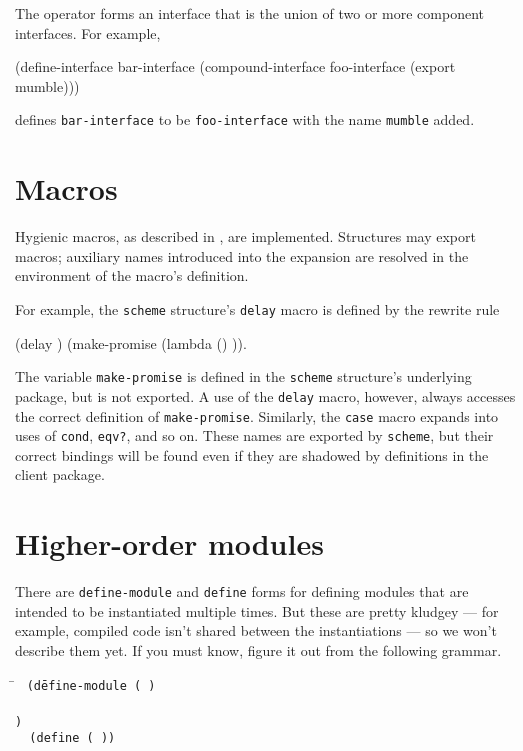 The  operator forms an interface that is the
union of two or more component interfaces.  For example,
\begin{example}
(define-interface bar-interface
  (compound-interface foo-interface (export mumble)))
\end{example}
defines {\tt bar-interface} to be {\tt foo-interface} with the name
{\tt mumble} added.


\section{Macros}

Hygienic macros, as described in
\cite{Clinger-Rees:Macros,Clinger-Rees:R4RS}, are implemented.
Structures may export macros; auxiliary names introduced into the
expansion are resolved in the environment of the macro's definition.

For example, the {\tt scheme} structure's {\tt delay} macro 
is defined by the rewrite rule
\begin{example}
(delay )  \xform  (make-promise (lambda () )).
\end{example}
The variable {\tt make-promise} is defined in the {\tt scheme}
structure's underlying package, but is not exported.  A use of the
{\tt delay} macro, however, always accesses the correct definition
of {\tt make-promise}.  Similarly, the {\tt case} macro expands into
uses of {\tt cond}, {\tt eqv?}, and so on.  These names are exported
by {\tt scheme}, but their correct bindings will be found even if they
are shadowed by definitions in the client package.


\section{Higher-order modules}

There are {\tt define-module} and {\tt define} forms for
defining modules that are intended to be instantiated multiple times.
But these are pretty kludgey --- for example, compiled code isn't
shared between the instantiations --- so we won't describe them yet.
If you must know, figure it out from the following grammar.
\begin{tabbing}
\qquad
    \=\goesto{}~
      \tt(d\=efine-module ( ) \\
       \>  \> \\
       \>  \>\tt) \\
        \>\altz{}~ \tt(define 
                        ( ))
\end{tabbing}


